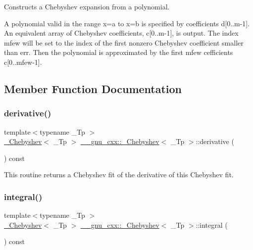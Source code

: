 Constructs a Chebyshev expansion from a polynomial.

A polynomial valid in the range x=a to x=b is specified by coefficients d\mbox{[}0..m-\/1\mbox{]}. An equivalent array of Chebyshev coefficients, c\mbox{[}0..m-\/1\mbox{]}, is output. The index mfew will be set to the index of the first nonzero Chebyshev coefficient smaller than err. Then the polynomial is approximated by the first mfew cefficients c\mbox{[}0..mfew-\/1\mbox{]}. 

\subsection{Member Function Documentation}
\mbox{\label{class____gnu__cxx_1_1__Chebyshev_a690446e057539c62406212dea9d6f6c6}} 
\subsubsection{\texorpdfstring{derivative()}{derivative()}}
{\footnotesize\ttfamily template$<$typename \+\_\+\+Tp $>$ \\
\hyperlink{class____gnu__cxx_1_1__Chebyshev}{\+\_\+\+Chebyshev}$<$ \+\_\+\+Tp $>$ \hyperlink{class____gnu__cxx_1_1__Chebyshev}{\+\_\+\+\_\+gnu\+\_\+cxx\+::\+\_\+\+Chebyshev}$<$ \+\_\+\+Tp $>$\+::derivative (\begin{DoxyParamCaption}{ }\end{DoxyParamCaption}) const}

This routine returns a Chebyshev fit of the derivative of this Chebyshev fit. \mbox{\label{class____gnu__cxx_1_1__Chebyshev_ad6238062674a4ab03fda28c8d1e3774b}} 
\subsubsection{\texorpdfstring{integral()}{integral()}}
{\footnotesize\ttfamily template$<$typename \+\_\+\+Tp $>$ \\
\hyperlink{class____gnu__cxx_1_1__Chebyshev}{\+\_\+\+Chebyshev}$<$ \+\_\+\+Tp $>$ \hyperlink{class____gnu__cxx_1_1__Chebyshev}{\+\_\+\+\_\+gnu\+\_\+cxx\+::\+\_\+\+Chebyshev}$<$ \+\_\+\+Tp $>$\+::integral (\begin{DoxyParamCaption}{ }\end{DoxyParamCaption}) const}


